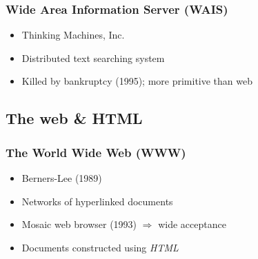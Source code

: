 \usebackgroundtemplate{}




\frame
{
	\frametitle{Wide Area Information Server (WAIS)}
	
	\begin{itemize}
	
		\item Thinking Machines, Inc.
		
		\item Distributed text searching system
		
		\item Killed by bankruptcy (1995); more primitive than web
	
	\end{itemize}

}




\subsection*{The web \& HTML}




\frame
{
	\frametitle{The World Wide Web (WWW)}
	
	\begin{itemize}
	
		\item Berners-Lee (1989)
		
		\item Networks of hyperlinked documents
		
		
		\item Mosaic web browser (1993) \(\Rightarrow\) wide acceptance
		
		\item Documents constructed using \emph{HTML}
	
	\end{itemize}

}




